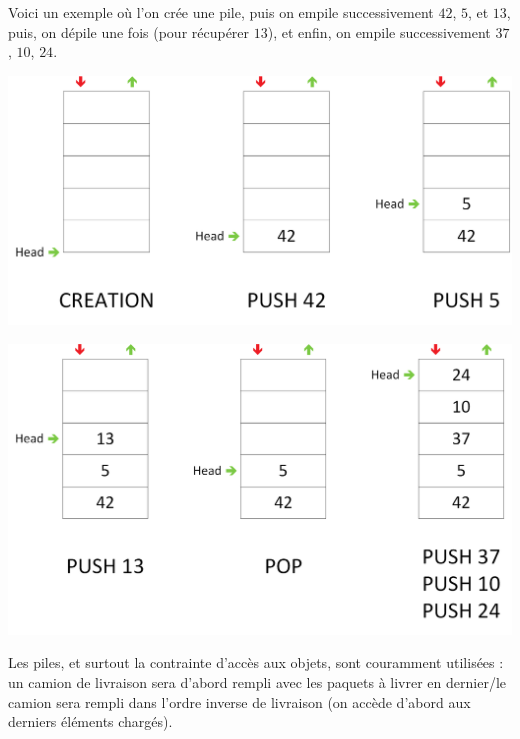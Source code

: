 \documentclass[11pt,a4paper]{article}
\begin{document}
Voici un exemple où l'on crée une pile, puis on empile successivement $ 42 $, $ 5 $, et $ 13 $, puis, on dépile une fois (pour récupérer $ 13 $), et enfin, on empile successivement $ 37 $, $ 10 $, $ 24 $.\\

\vfillFirst

\begin{center}
\includegraphics[scale=0.5]{img/piles/Piles_2_Structure_Generale_Usage_pack_1.png}
\end{center}

\vfillLast

\clearpage

\begin{center}
\includegraphics[scale=0.5]{img/piles/Piles_2_Structure_Generale_Usage_pack_2.png}
\end{center}

\smallskip

Les piles, et surtout la contrainte d'accès aux objets, sont couramment utilisées : un camion de livraison sera d'abord rempli avec les paquets à livrer en dernier/le camion sera rempli dans l'ordre inverse de livraison (on accède d'abord aux derniers éléments chargés).
\end{document}
